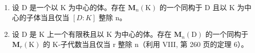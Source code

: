 
\begin{enumerate}
\def\labelenumi{\arabic{enumi})}
\item
  设 D 是一个以 K 为中心的体。存在 \(\mathbf{M}_{n}(\mathrm{K})\) 的一个同构于 D 且以 K 为中心的子体当且仅当 \([D:K]\) 整除 n。
\item
  设 D 是 K 上一个有限秩且以 K 为中心的体。存在 \(\mathbf{M}_{n}(\mathrm{D})\) 的一个同构于 \(\mathbf{M}_{r}(\mathrm{K})\) 的 K-子代数当且仅当 r 整除 n（利用 VIII, 第 260 页的定理 6）。
\end{enumerate}

